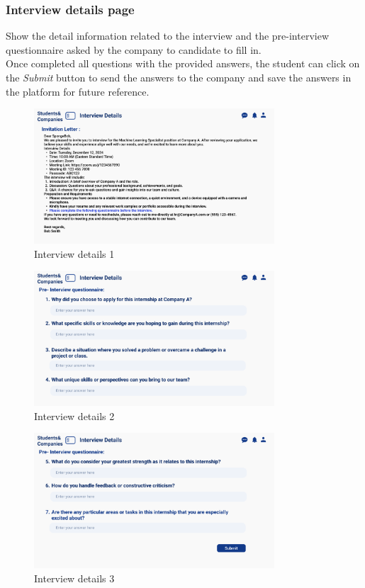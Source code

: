 \subsubsection{Interview details page}
Show the detail information related to the interview and the pre-interview questionnaire asked by the company to candidate to fill in.\\
Once completed all questions with the provided answers, the student can click on the \textit{Submit} button to send the answers to the company and save the answers in the platform for future reference.
\begin{figure}[H]
    \centering
    \includegraphics[width=0.8\textwidth]{Images/UI/Interview Details-student.png}
    \caption{Interview details 1}\label{fig:Interview details 1}
\end{figure}

\begin{figure}[H]
    \centering
    \includegraphics[width=0.8\textwidth]{Images/UI/Interview Details2-student.png}
    \caption{Interview details 2}\label{fig:Interview details 2}
\end{figure}

\begin{figure}[H]
    \centering
    \includegraphics[width=0.8\textwidth]{Images/UI/Interview Details3-student.png}
    \caption{Interview details 3}\label{fig:Interview details 3}
\end{figure}
